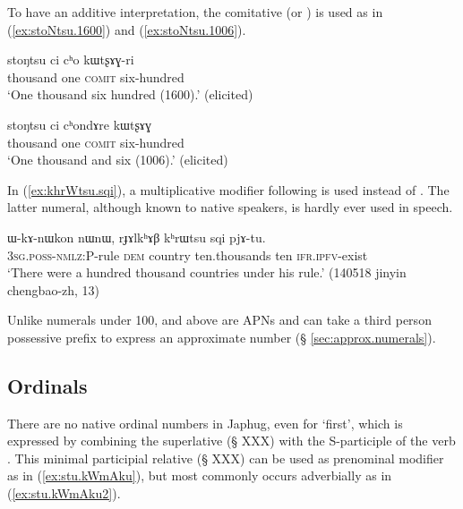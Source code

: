  To have an additive interpretation, the comitative  (or ) is used as in (\ref{ex:stoNtsu.1600}) and (\ref{ex:stoNtsu.1006}).
 
  \begin{exe}
\ex  \label{ex:stoNtsu.1600}
 \gll  stoŋtsu ci cʰo kɯtʂɤɣ-ri \\
 thousand one \textsc{comit} six-hundred \\
 \glt `One thousand six hundred (1600).' (elicited)
  \end{exe}
  
    \begin{exe}
\ex  \label{ex:stoNtsu.1006}
 \gll  stoŋtsu ci cʰondɤre kɯtʂɤɣ \\
 thousand one \textsc{comit} six-hundred \\
 \glt `One thousand and six (1006).' (elicited)
  \end{exe}

In (\ref{ex:khrWtsu.sqi}), a multiplicative modifier  following  is used instead of . The latter numeral, although known to native speakers, is hardly ever used in speech.

\begin{exe}
\ex  \label{ex:khrWtsu.sqi}
 \gll ɯ-kɤ-nɯkon nɯnɯ, rɟɤlkʰɤβ kʰrɯtsu sqi pjɤ-tu. \\
 \textsc{3sg}.\textsc{poss}-\textsc{nmlz}:P-rule \textsc{dem} country ten.thousands ten \textsc{ifr}.\textsc{ipfv}-exist \\
 \glt `There were a hundred thousand countries under his rule.' (140518 jinyin chengbao-zh, 13)
 \end{exe} 


 
Unlike numerals under 100,  and above are APNs and can take a third person possessive prefix  to express an approximate number (§ \ref{sec:approx.numerals}).

 \subsection{Ordinals} \label{sec:ordinals}
 
 There are no native ordinal numbers in Japhug, even for `first', which is expressed by combining the superlative  (§ XXX) with the S-participle of the verb . This minimal participial relative  (§ XXX) can be used as prenominal modifier as in (\ref{ex:stu.kWmAku}), but most commonly occurs adverbially as in (\ref{ex:stu.kWmAku2}).   
 
